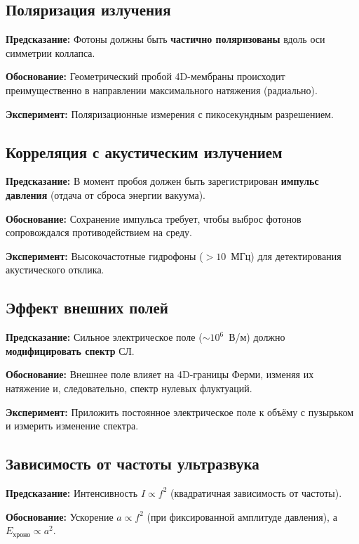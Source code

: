 \documentclass[12pt,a4paper]{article}
\begin{document}
\subsection{Поляризация излучения}

\textbf{Предсказание:} Фотоны должны быть \textbf{частично поляризованы} вдоль оси симметрии коллапса.

\textbf{Обоснование:} Геометрический пробой 4D-мембраны происходит преимущественно в направлении максимального натяжения (радиально).

\textbf{Эксперимент:} Поляризационные измерения с пикосекундным разрешением.

\subsection{Корреляция с акустическим излучением}

\textbf{Предсказание:} В момент пробоя должен быть зарегистрирован \textbf{импульс давления} (отдача от сброса энергии вакуума).

\textbf{Обоснование:} Сохранение импульса требует, чтобы выброс фотонов сопровождался противодействием на среду.

\textbf{Эксперимент:} Высокочастотные гидрофоны ($>10$~МГц) для детектирования акустического отклика.

\subsection{Эффект внешних полей}

\textbf{Предсказание:} Сильное электрическое поле ($\sim 10^6$~В/м) должно \textbf{модифицировать спектр} СЛ.

\textbf{Обоснование:} Внешнее поле влияет на 4D-границы Ферми, изменяя их натяжение и, следовательно, спектр нулевых флуктуаций.

\textbf{Эксперимент:} Приложить постоянное электрическое поле к объёму с пузырьком и измерить изменение спектра.

\subsection{Зависимость от частоты ультразвука}

\textbf{Предсказание:} Интенсивность $I \propto f^2$ (квадратичная зависимость от частоты).

\textbf{Обоснование:} Ускорение $a \propto f^2$ (при фиксированной амплитуде давления), а $E_{\text{хроно}} \propto a^2$.
\end{document}
